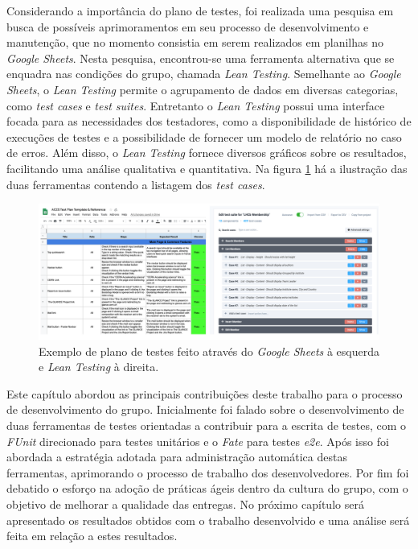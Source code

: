 Considerando a importância do plano de testes, foi realizada uma pesquisa em busca de possíveis aprimoramentos em seu processo de desenvolvimento e manutenção, que no momento consistia em serem realizados em planilhas no \emph{Google Sheets}. Nesta pesquisa, encontrou-se uma ferramenta alternativa que se enquadra nas condições do grupo, chamada \emph{Lean Testing}. Semelhante ao \emph{Google Sheets}, o \emph{Lean Testing} permite o agrupamento de dados em diversas categorias, como \emph{test cases} e \emph{test suites}. Entretanto o \emph{Lean Testing} possui uma interface focada para as necessidades dos testadores, como a disponibilidade de histórico de execuções de testes e a possibilidade de fornecer um modelo de relatório no caso de erros. Além disso, o \emph{Lean Testing} fornece diversos gráficos sobre os resultados, facilitando uma análise qualitativa e quantitativa. Na figura \ref{fig:plano-testesfig:teste-unitario} há a ilustração das duas ferramentas contendo a listagem dos \emph{test cases}.

\begin{figure}[H]
    \centering
    \includegraphics[width=15cm]{source/4-solucao/images/plano-testes.png}
    \caption{Exemplo de plano de testes feito através do \emph{Google Sheets} à esquerda e \emph{Lean Testing} à direita.}
    \label{fig:plano-testesfig:teste-unitario}
\end{figure}

Este capítulo abordou as principais contribuições deste trabalho para o processo de desenvolvimento do grupo. Inicialmente foi falado sobre o desenvolvimento de duas ferramentas de testes orientadas a contribuir para a escrita de testes, com o \emph{FUnit} direcionado para testes unitários e o \emph{Fate} para testes \emph{e2e}. Após isso foi abordada a estratégia adotada para administração automática destas ferramentas, aprimorando o processo de trabalho dos desenvolvedores. Por fim foi debatido o esforço na adoção de práticas ágeis dentro da cultura do grupo, com o objetivo de melhorar a qualidade das entregas. No próximo capítulo será apresentado os resultados obtidos com o trabalho desenvolvido e uma análise será feita em relação a estes resultados.